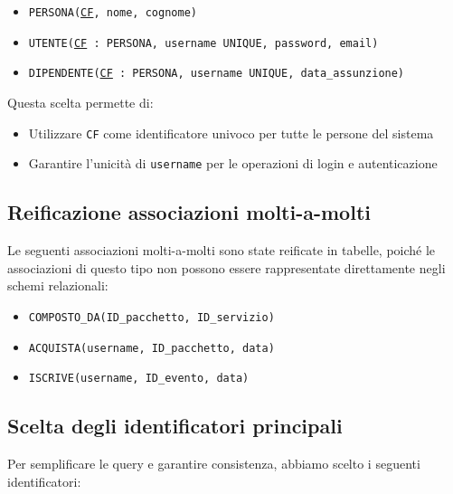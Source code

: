 \documentclass[a4paper,12pt]{report}
\begin{document}
\begin{itemize}
	\item \texttt{PERSONA(\underline{CF}, nome, cognome)}
	\item \texttt{UTENTE(\underline{CF} : PERSONA, username~UNIQUE, password, email)}
	\item \texttt{DIPENDENTE(\underline{CF} : PERSONA, username~UNIQUE, data\_assunzione)}
\end{itemize}

\vspace{\baselineskip}
\noindent Questa scelta permette di:
\begin{itemize}
	\item Utilizzare \texttt{CF} come identificatore univoco per tutte le persone del sistema
	\item Garantire l'unicità di \texttt{username} per le operazioni di login e autenticazione
\end{itemize}

\subsection{Reificazione associazioni molti-a-molti}

Le seguenti associazioni molti-a-molti sono state reificate in tabelle, poiché le associazioni di
questo tipo non possono essere rappresentate direttamente negli schemi relazionali:

\begin{itemize}
	\item \texttt{COMPOSTO\_DA(ID\_pacchetto, ID\_servizio)}
	\item \texttt{ACQUISTA(username, ID\_pacchetto, data)}
	\item \texttt{ISCRIVE(username, ID\_evento, data)}
\end{itemize}

\subsection{Scelta degli identificatori principali}
Per semplificare le query e garantire consistenza, abbiamo scelto i seguenti identificatori:
\end{document}
